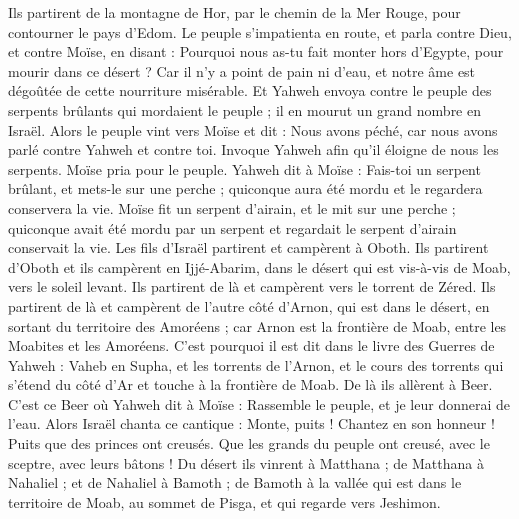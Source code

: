 \begin{multicols}{2}
Ils partirent de la montagne de Hor, par le chemin de la Mer Rouge, pour contourner le pays d'Edom. Le peuple s’impatienta en route,
et parla contre Dieu, et contre Moïse, en disant : Pourquoi nous as-tu fait monter hors d'Egypte, pour mourir dans ce désert ? Car il n’y a point de pain ni d'eau, et notre âme est dégoûtée de cette nourriture misérable.
Et Yahweh envoya contre le peuple des serpents brûlants qui mordaient le peuple ; il en mourut un grand nombre en Israël.
Alors le peuple vint vers Moïse et dit : Nous avons péché, car nous avons parlé contre Yahweh et contre toi. Invoque Yahweh afin qu'il éloigne de nous les serpents. Moïse pria pour le peuple.
Yahweh dit à Moïse : Fais-toi un serpent brûlant, et mets-le sur une perche ; quiconque aura été mordu et le regardera conservera la vie.
Moïse fit un serpent d'airain, et le mit sur une perche ; quiconque avait été mordu par un serpent et regardait le serpent d'airain conservait la vie.
Les fils d'Israël partirent et campèrent à Oboth.
Ils partirent d'Oboth et ils campèrent en Ijjé-Abarim, dans le désert qui est vis-à-vis de Moab, vers le soleil levant.
Ils partirent de là et campèrent vers le torrent de Zéred.
Ils partirent de là et campèrent de l’autre côté d'Arnon, qui est dans le désert, en sortant du territoire des Amoréens ; car Arnon est la frontière de Moab, entre les Moabites et les Amoréens.
C'est pourquoi il est dit dans le livre des Guerres de Yahweh : Vaheb en Supha, et les torrents de l’Arnon,
et le cours des torrents qui s’étend du côté d’Ar et touche à la frontière de Moab.
De là ils allèrent à Beer. C'est ce Beer où Yahweh dit à Moïse : Rassemble le peuple, et je leur donnerai de l'eau.
Alors Israël chanta ce cantique : Monte, puits ! Chantez en son honneur !
Puits que des princes ont creusés. Que les grands du peuple ont creusé, avec le sceptre, avec leurs bâtons ! Du désert ils vinrent à Matthana ;
de Matthana à Nahaliel ; et de Nahaliel à Bamoth ;
de Bamoth à la vallée qui est dans le territoire de Moab, au sommet de Pisga, et qui regarde vers Jeshimon.

\end{multicols}
